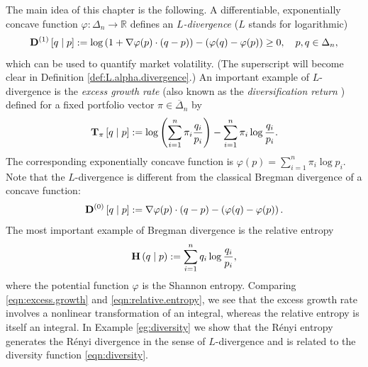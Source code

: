 \documentclass[graybox]{svmult}
\begin{document}
The main idea of this chapter is the following. A differentiable, exponentially concave function $\varphi: \Delta_n \rightarrow \mathbb{R}$ defines an {\it $L$-divergence} ($L$ stands for logarithmic)
\begin{equation} \label{eqn:L.divergence}
{\bf D}^{(1)}\left[q \mid p \right] := \log \left(1 + \nabla \varphi(p) \cdot (q - p)\right) - \left( \varphi(q) - \varphi(p) \right) \geq 0, \quad p, q \in \Delta_n,
\end{equation}
which can be used to quantify market volatility. (The superscript will become clear in Definition \ref{def:L.alpha.divergence}.) An important example of $L$-divergence is the {\it excess growth rate} (also known as the {\it diversification return} \cite{BF92}) defined for a fixed portfolio vector $\pi \in \overline{\Delta}_n$ by
\begin{equation} \label{eqn:excess.growth}
{\bf T}_{\pi} \left[q \mid p\right] := \log \left( \sum_{i = 1}^n \pi_i \frac{q_i}{p_i} \right) - \sum_{i = 1}^n \pi_i \log \frac{q_i}{p_i}.
\end{equation}
The corresponding exponentially concave function is $\varphi(p) = \sum_{i = 1}^n \pi_i \log p_i$. Note that the $L$-divergence is different from the classical Bregman divergence of a concave function:
\begin{equation}  \label{eqn:Bregman.divergence}
{\bf D}^{(0)}\left[q \mid p\right] := \nabla \varphi(p) \cdot (q - p) - \left( \varphi(q) - \varphi(p) \right).
\end{equation}
The most important example of Bregman divergence is the relative entropy
\begin{equation} \label{eqn:relative.entropy}
{\bf H} \left(q \mid p\right) := \sum_{i = 1}^n q_i \log \frac{q_i}{p_i},
\end{equation}
where the potential function $\varphi$ is the Shannon entropy. Comparing \eqref{eqn:excess.growth} and \eqref{eqn:relative.entropy}, we see that the excess growth rate involves a nonlinear transformation of an integral, whereas the relative entropy is itself an integral. In Example \ref{eg:diversity} we show that the R\'{e}nyi entropy generates the R\'{e}nyi divergence in the sense of $L$-divergence and is related to the diversity function \eqref{eqn:diversity}.
\end{document}

